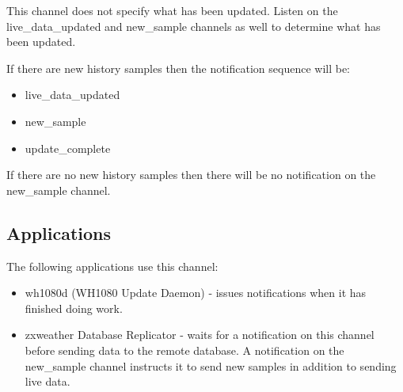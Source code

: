 \documentclass[a4paper,10pt]{book}
\makeatletter
\newcommand{\partnumber}{\ifthenelse{\isundefined{\projectnum}}{}{\projectnum-\docnum	\ifthenelse{\equal{\docrev}{001}}{}{.\docrev}}}
\newcommand*{\cleartoleftpage}{%
  \clearpage
    \if@twoside
    \ifodd\c@page
      \hbox{}\newpage
      \if@twocolumn
        \hbox{}\newpage
      \fi
    \fi
  \fi
}
\makeatother
\begin{document}
This channel does not specify what has been updated. Listen on the live\_data\_updated and new\_sample channels as well to determine what has been updated.

If there are new history samples then the notification sequence will be:
\begin{itemize}
\item live\_data\_updated
\item new\_sample
\item update\_complete
\end{itemize}

If there are no new history samples then there will be no notification on the new\_sample channel.

\subsection{Applications}
The following applications use this channel:

\begin{itemize}
\item wh1080d (WH1080 Update Daemon) - issues notifications when it has finished doing work.
\item zxweather Database Replicator - waits for a notification on this channel before sending data to the remote database. A notification on the new\_sample channel instructs it to send new samples in addition to sending live data.
\end{itemize}

\cleartoleftpage
\thispagestyle{empty}
\begin{flushright}
\null
\vfill
\tt \partnumber
\end{flushright}
\end{document}
